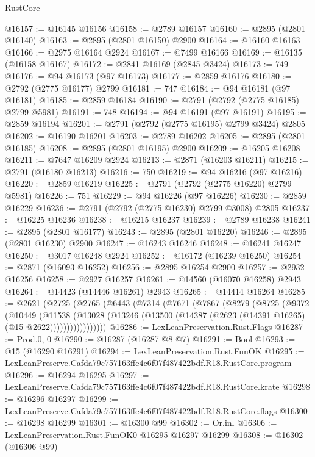 \begin{lexlean}{RustCore}
\begin{coremodule}
@16157 := @16145 @16156
@16158 := @2789 @16157
@16160 := @2895 (@2801 @16140)
@16163 := @2895 (@2801 @16150) @2900
@16164 := @16160 @16163
@16166 := @2975 @16164 @2924
@16167 := @7499 @16166
@16169 := @16135 (@16158 @16167)
@16172 := @2841 @16169 (@2845 @3424)
@16173 := 749
@16176 := @94 @16173 (@97 @16173)
@16177 := @2859 @16176
@16180 := @2792 (@2775 @16177) @2799
@16181 := 747
@16184 := @94 @16181 (@97 @16181)
@16185 := @2859 @16184
@16190 := @2791 (@2792 (@2775 @16185) @2799 @5981)
@16191 := 748
@16194 := @94 @16191 (@97 @16191)
@16195 := @2859 @16194
@16201 := @2791 (@2792 (@2775 @16195) @2799 @3424) @2805
@16202 := @16190 @16201
@16203 := @2789 @16202
@16205 := @2895 (@2801 @16185)
@16208 := @2895 (@2801 @16195) @2900
@16209 := @16205 @16208
@16211 := @7647 @16209 @2924
@16213 := @2871 (@16203 @16211)
@16215 := @2791 (@16180 @16213)
@16216 := 750
@16219 := @94 @16216 (@97 @16216)
@16220 := @2859 @16219
@16225 := @2791 (@2792 (@2775 @16220) @2799 @5981)
@16226 := 751
@16229 := @94 @16226 (@97 @16226)
@16230 := @2859 @16229
@16236 := @2791 (@2792 (@2775 @16230) @2799 @3008) @2805
@16237 := @16225 @16236
@16238 := @16215 @16237
@16239 := @2789 @16238
@16241 := @2895 (@2801 @16177)
@16243 := @2895 (@2801 @16220)
@16246 := @2895 (@2801 @16230) @2900
@16247 := @16243 @16246
@16248 := @16241 @16247
@16250 := @3017 @16248 @2924
@16252 := @16172 (@16239 @16250)
@16254 := @2871 (@16093 @16252)
@16256 := @2895 @16254 @2900
@16257 := @2932 @16256
@16258 := @2927 @16257
@16261 := @14560 (@16070 @16258) @2943
@16264 := @14423 (@14446 @16261) @2943
@16265 := @14414 @16264
@16285 := @2621
    (@2725
      (@2765
        (@6443
          (@7314
            (@7671
              (@7867
                (@8279
                  (@8725
                    (@9372
                      (@10449
                        (@11538
                          (@13028
                            (@13246
                              (@13500 (@14387 (@2623 (@14391 @16265) (@15 @2622)))))))))))))))))
@16286 := LexLeanPreservation.Rust.Flags
@16287 := Prod.{0, 0}
@16290 := @16287 (@16287 @8 @7)
@16291 := Bool
@16293 := @15 (@16290 @16291)
@16294 := LexLeanPreservation.Rust.FunOK
@16295 := LexLeanPreserve.Cafda79c757163ffe4c6f07f487422bdf.R18.RustCore.program
@16296 := @16294 @16295
@16297 := LexLeanPreserve.Cafda79c757163ffe4c6f07f487422bdf.R18.RustCore.krate
@16298 := @16296 @16297
@16299 := LexLeanPreserve.Cafda79c757163ffe4c6f07f487422bdf.R18.RustCore.flags
@16300 := @16298 @16299
@16301 := @16300 @99
@16302 := Or.inl
@16306 := LexLeanPreservation.Rust.FunOK0 @16295 @16297 @16299
@16308 := @16302 (@16306 @99)

\end{coremodule}
\end{lexlean}

